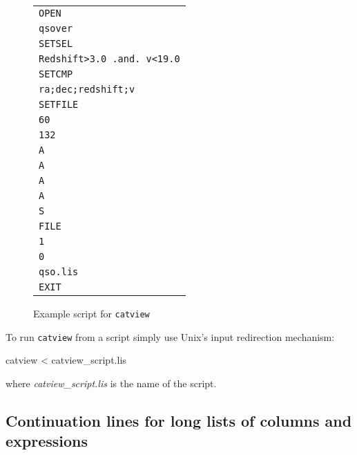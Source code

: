 \documentclass[twoside,11pt]{starlink}
\begin{document}
\begin{figure}[htbp]
\begin{center}

\begin{tabular}{l}
\texttt{OPEN}                    \\
\texttt{qsover}                  \\
\texttt{SETSEL}                  \\
\texttt{Redshift>3.0 .and. v<19.0} \\
\texttt{SETCMP}                  \\
\texttt{ra;dec;redshift;v}       \\
\texttt{SETFILE}                 \\
\texttt{60}                      \\
\texttt{132}                     \\
\texttt{A}                       \\
\texttt{A}                       \\
\texttt{A}                       \\
\texttt{A}                       \\
\texttt{S}                       \\
\texttt{FILE}                    \\
\texttt{1}                       \\
\texttt{0}                       \\
\texttt{qso.lis}                 \\
\texttt{EXIT}                    \\
\end{tabular}

\caption{Example script for \texttt{catview}\label{CATVIEW_SCRIPT} }

\end{center}
\end{figure}

To run \texttt{catview} from a script simply use Unix's input redirection
mechanism:

\begin{terminalv}
catview < catview_script.lis
\end{terminalv}

where \textit{catview\_script.lis}\/ is the name of the script.

\subsection{\label{LONGLINE}Continuation lines for long lists of
columns and expressions}
\end{document}
